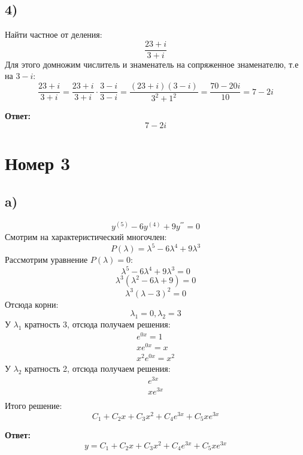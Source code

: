 \documentclass[a4paper, 12pt]{article}
\begin{document}
\subsection*{4)}
Найти частное от деления:
\[
\frac{23 + i}{3 + i}
\]
Для этого домножим числитель и знаменатель на сопряженное знаменателю, т.е на $3 - i$:
\[
\frac{23 + i}{3 + i}
=
\frac{23 + i}{3 + i} 
\cdot
\frac{3 - i}{3- i} 
=
\frac{(23 +i) (3 - i)}{3^2 + 1^2}
=
\frac{70 - 20i}{10}
= 7 - 2i
\]
\begin{center}
\textbf{Ответ: } 
\[
7 - 2i
\]
\end{center}
\clearpage
\section*{Номер 3}
\subsection*{a)}
\[
y^{(5)}  - 6y^{(4)} + 9y^{'''} = 0
\]
Смотрим на характеристический многочлен:
\[
P(\lambda) = \lambda^5 - 6 \lambda^4 + 9 \lambda^3
\]
Рассмотрим уравнение $P(\lambda) = 0$:
\[
\lambda^5 - 6 \lambda^4 + 9 \lambda^3 = 0
\]
\[
\lambda^3(\lambda^2 - 6\lambda + 9) = 0
\]
\[
\lambda^3 (\lambda - 3)^2 = 0
\]
Отсюда корни:
\[
\lambda_1 = 0, \lambda_2 = 3
\]
У $\lambda_1$ кратность 3, отсюда получаем решения:
\[
      \begin{gathered} 
e^{0x}  = 1 \\
x e^{0x} = x \\
x^2 e^{0x} = x^2
      \end{gathered} 
\]
У $\lambda_2$ кратность 2, отсюда получаем решения:
\[
      \begin{gathered} 
e^{3x} \\
xe^{3x} \\
      \end{gathered} 
\]
Итого решение:
\[
C_1 + C_2 x + C_3 x^2 + C_4 e^{3x} + C_5 xe^{3x}
\]
\begin{center}
\textbf{Ответ: } 
\[
y = C_1 + C_2 x + C_3 x^2 + C_4 e^{3x} + C_5 xe^{3x}
\]
\end{center}
\clearpage
\end{document}
